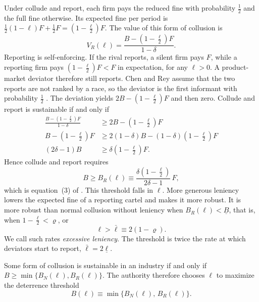Under collude and report, each firm pays the reduced fine with probability $\frac{1}{2}$ and the full fine otherwise.
Its expected fine per period is $\frac{1}{2}(1-\ell)F + \frac{1}{2}F = (1 - \frac{\ell}{2})F$. The value of this
form of collusion is
\begin{equation}\label{eq:12-cr-VR}
V_R(\ell) = \frac{B - \left(1 - \frac{\ell}{2}\right)F}{1-\delta}.
\end{equation}
Reporting is self-enforcing. If the rival reports, a silent firm pays $F$, while a reporting firm pays
$(1 - \frac{\ell}{2})F < F$ in expectation, for any $\ell > 0$. A product-market deviator therefore still reports.
Chen and Rey assume that the two reports are not ranked by a race, so the deviator is the first informant with
probability $\frac{1}{2}$ \citep[footnote~11]{ChenRey2013}. The deviation yields $2B - (1 - \frac{\ell}{2})F$ and then
zero. Collude and report is sustainable if and only if
\begin{align*}
\frac{B - \left(1 - \frac{\ell}{2}\right)F}{1-\delta} &\ge 2B - \left(1 - \frac{\ell}{2}\right)F\\
B - \left(1 - \frac{\ell}{2}\right)F &\ge 2(1-\delta)B - (1-\delta)\left(1 - \frac{\ell}{2}\right)F\\
(2\delta - 1)B &\ge \delta\left(1 - \frac{\ell}{2}\right)F.
\end{align*}
Hence collude and report requires
\begin{equation}\label{eq:12-cr-BR}
B \ge B_R(\ell) \equiv \frac{\delta\left(1 - \frac{\ell}{2}\right)}{2\delta - 1}\,F,
\end{equation}
which is equation~(3) of \citet{ChenRey2013}. This threshold falls in $\ell$. More generous leniency lowers the
expected fine of a reporting cartel and makes it more robust. It is more robust than normal collusion without leniency
when $B_R(\ell) < \underline B$, that is, when $1 - \frac{\ell}{2} < \varrho$, or
\begin{equation}\label{eq:12-cr-qbar}
\ell > \bar\ell \equiv 2(1 - \varrho).
\end{equation}
We call such rates \emph{excessive leniency}. The threshold is twice the rate at which deviators start to report,
$\bar\ell = 2\underline\ell$.

Some form of collusion is sustainable in an industry if and only if $B \ge \min\{B_N(\ell), B_R(\ell)\}$. The
authority therefore chooses $\ell$ to maximize the deterrence threshold
\begin{equation}\label{eq:12-cr-objective}
B(\ell) \equiv \min\{B_N(\ell),\, B_R(\ell)\}.
\end{equation}

